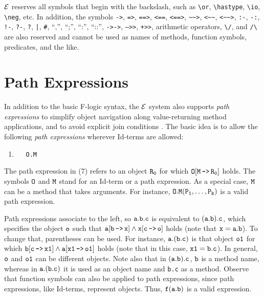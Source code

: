\documentclass[11pt]{article}
\newcommand{\ERGO}{\mbox{\ensuremath{\cal{E}}\smaller{{\sc{RGO}}}}\xspace}
\newcommand{\FLSYSTEM}{\ERGO}
\newcommand{\mvd}{{\mbox{\tt \,->\,}}}  %
\newcommand{\rnafarr}{\texttt{\textasciitilde\textasciitilde>}}
\newcommand{\lnafarr}{\texttt{<\textasciitilde\textasciitilde}}
\newcommand{\rlnafarr}{\texttt{<\textasciitilde\textasciitilde>}}
\newcommand{\bs}{\textbackslash}
\newcommand{\fl}{\mbox{F-logic}\xspace}
\newcommand{\RULELOGNEG}{{\texttt{{\bs}neg}}\xspace}
\begin{document}
\FLSYSTEM reserves all symbols that begin with the backslash, such as
\texttt{\bs{}or},  \texttt{\bs{}hastype},  \texttt{\bs{}io}, \RULELOGNEG, etc. 
In addition, the symbols \texttt{->}, \texttt{=>}, \texttt{==>}, \texttt{<==},
\texttt{<==>}, \rnafarr, \lnafarr, \rlnafarr, \texttt{:-}, \texttt{-:},
\texttt{!-}, \texttt{?-}, \texttt{?}, \texttt{|}, \texttt{\#}, ``,'', ``;'',
``:'', ``::'', \texttt{->->}, \texttt{-->>},  \texttt{+>>},  
arithmetic operators, \verb|\/|, and \verb|/\|  
are also reserved and cannot be used as names of methods,
function symbols, predicates, and the like.



\section{Path Expressions}\label{sec-pathexpr}


 
In addition to the basic \fl syntax, the \FLSYSTEM  system also supports
\emph{path expressions} to simplify object navigation along
value-returning method applications, and to avoid
explicit join conditions \cite{frohn-lausen-uphoff-VLDB-94}.  The
basic idea is to allow the following \emph{path expressions} wherever
Id-terms are allowed:

  \medskip

\begin{enumerate} 
\item[7.]\label{eq-path-fun} ~~ {\tt O.M}
\end{enumerate} \medskip

\noindent
The path expression in (7) refers to an object $\tt R_0$ for which $\tt
O[M\mvd R_0]$ holds.  The symbols $\tt O$ and $\tt M$ stand for an Id-term
or a path expression.  As a special case, $\tt M$ can be a method that
takes arguments. For instance, $\tt O.M(P_1,\dots,P_k)$ is a valid path
expression.
  
Path expressions
associate to the left, so $\tt a.b.c$ is equivalent to $\tt (a.b).c$, which
specifies the object $\tt o$ such that $\tt a[b\mvd x] \land x[c\mvd o]$
holds (note that $\tt x=a.b$).
To change that, parentheses can be used. For instance, 
$\tt a.(b.c)$ is that object
$\tt o1$ for which $\tt b[c\mvd x1] \land a[x1\mvd o1]$ holds (note that in this
case, $\tt x1=b.c$). In general, $\tt o$ and $\tt o1$ can be different objects.
Note also that in $\tt (a.b).c$, $\tt b$ is a method name, whereas in $\tt
a.(b.c)$ it is used as an object name and {\tt b.c} as a method.  Observe
that function symbols can also be applied to path expressions, since path
expressions, like Id-terms, represent objects. Thus, $\tt f(a.b)$
is a valid expression.
\end{document}

